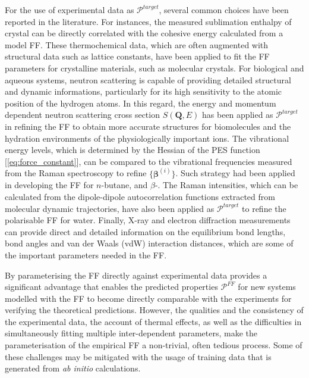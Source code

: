 For the use of experimental data as $\mathcal{P}^{target}$, several common choices have been reported in the literature. For instances, the measured sublimation enthalpy of crystal can be directly correlated with the cohesive energy calculated from a model FF. These thermochemical data, which are often augmented with structural data such as lattice constants, have been applied to fit the FF parameters for crystalline materials, such as molecular crystals.\cite{williams1967nonbonded,warshel1970consistent,pyzer2016optimized,bunte2000molecular} %
For biological and aqueous systems, neutron scattering is capable of providing detailed structural and dynamic informations, particularly for its high sensitivity to the atomic position of the hydrogen atoms. In this regard, the energy and momentum dependent neutron scattering cross section $S(\bm{Q},E)$  has been applied as $\mathcal{P}^{target}$ in refining the FF  to obtain more accurate structures for biomolecules\cite{lynch2017automated,pluhackova2015extension} and the hydration environments of the physiologically important ions.\cite{martinek2018calcium,kohagen2016accounting,duboue2017hydration} The vibrational energy levels, which is determined by the Hessian of the PES function [\cref{eq:force_constant}], can be compared to the vibrational frequencies measured from the Raman spectroscopy to refine $\{\bm{\beta}^{(i)}\}$. Such strategy had been applied in developing the FF for $n$-butane,\cite{murphy1991harmonic} and $\beta$-.\cite{dohy1982raman} The Raman intensities, which can be  calculated from the dipole-dipole autocorrelation functions extracted from molecular dynamic trajectories, have also been applied as $\mathcal{P}^{target}$ to refine the polarisable FF for water.\cite{sidler2018efficient} Finally, X-ray and electron diffraction measurements can provide direct and detailed information on the equilibrium bond lengths, bond angles and van der Waals (vdW) interaction distances, which are some of the important parameters needed in the FF.\cite{sun1998compass,zgarbova2013toward,aytenfisu2017revised} 

By parameterising the FF directly against experimental data provides a significant advantage that enables the predicted properties $\mathcal{P}^{FF}$ for new systems modelled with the FF to become directly comparable with the experiments for verifying the theoretical predictions. However, the qualities and the consistency of the experimental data, the account of thermal effects, as well as the difficulties in simultaneously fitting multiple inter-dependent parameters, make the parameterisation of the empirical FF a non-trivial, often  tedious process. Some of these challenges may be mitigated with the usage of training data that is generated from \emph{ab initio} calculations.

